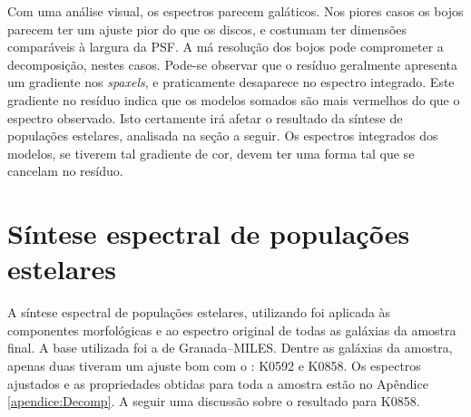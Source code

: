Com uma análise visual, os espectros parecem galáticos. Nos piores casos os
bojos parecem ter um ajuste pior do que os discos, e costumam ter dimensões
comparáveis à largura da PSF. A má resolução dos bojos pode comprometer a
decomposição, nestes casos. Pode-se observar que o resíduo geralmente apresenta
um gradiente nos {\em spaxels}, e praticamente desaparece no espectro integrado.
Este gradiente no resíduo indica que os modelos somados são mais vermelhos do
que o espectro observado. Isto certamente irá afetar o resultado da síntese de
populações estelares, analisada na seção a seguir. Os espectros integrados dos
modelos, se tiverem tal gradiente de cor, devem ter uma forma tal que se
cancelam no resíduo.

\section{Síntese espectral de populações estelares}
\label{sec:Decomp:sintese}

A síntese espectral de populações estelares, utilizando \starlight foi aplicada
às componentes morfológicas e ao espectro original de todas as galáxias da
amostra final. A base utilizada foi a de Granada--MILES. Dentre as galáxias da
amostra, apenas duas tiveram um ajuste bom com o \starlight: K0592 e K0858. Os
espectros ajustados e as propriedades obtidas para toda a amostra estão no
Apêndice \ref{apendice:Decomp}. A seguir uma discussão sobre o resultado para
K0858.

